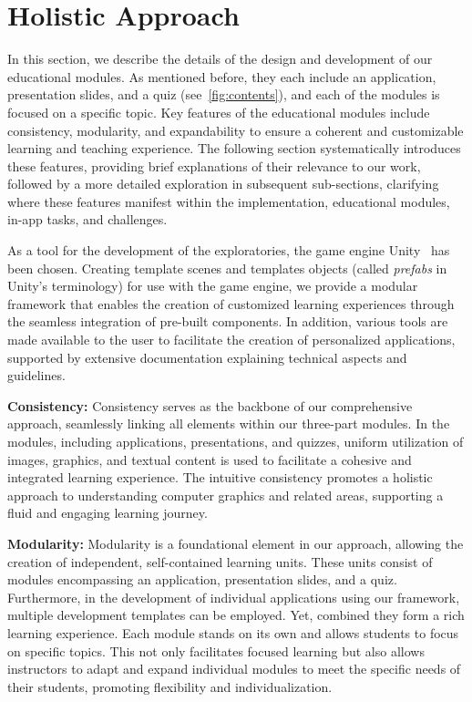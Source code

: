\section{Holistic Approach}
In this section, we describe the details of the design and development of our educational modules. As mentioned before, they each include an application, presentation slides, and a quiz (see~\autoref{fig:contents}), and each of the modules is focused on a specific topic. Key features of the educational modules include consistency, modularity, and expandability to ensure a coherent and customizable learning and teaching experience. The following section systematically introduces these features, providing brief explanations of their relevance to our work, followed by a more detailed exploration in subsequent sub-sections, clarifying where these features manifest within the implementation, educational modules, in-app tasks, and challenges.

As a tool for the development of the exploratories, the game engine Unity~\cite{unity:2024:editor} has been chosen. Creating template scenes and templates objects (called \emph{prefabs} in Unity's terminology) for use with the game engine, we provide a modular framework that enables the creation of customized learning experiences through the seamless integration of pre-built components. In addition, various tools are made available to the user to facilitate the creation of personalized applications, supported by extensive documentation explaining technical aspects and guidelines.

\textbf{Consistency:}
Consistency serves as the backbone of our comprehensive approach, seamlessly linking all elements within our three-part modules. In the modules, including applications, presentations, and quizzes, uniform utilization of images, graphics, and textual content is used to facilitate a cohesive and integrated learning experience. The intuitive consistency promotes a holistic approach to understanding computer graphics and related areas, supporting a fluid and engaging learning journey.

\textbf{Modularity:}
Modularity is a foundational element in our approach, allowing the creation of independent, self-contained learning units. These units consist of modules encompassing an application, presentation slides, and a quiz. Furthermore, in the development of individual applications using our framework, multiple development templates can be employed. Yet, combined they form a rich learning experience. Each module stands on its own and allows students to focus on specific topics. This not only facilitates focused learning but also allows instructors to adapt and expand individual modules to meet the specific needs of their students, promoting flexibility and individualization.


